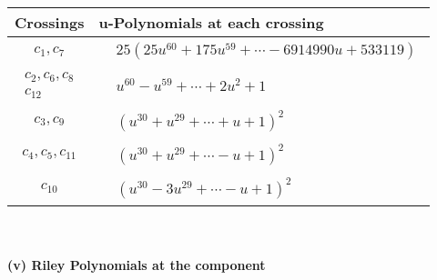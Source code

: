 \documentclass[1p]{elsarticle_modified}
\theoremstyle{definition}
\begin{document}
\begin{tabular}{m{50pt}|m{274pt}}
Crossings & \hspace{64pt}u-Polynomials at each crossing \\
\hline $$\begin{aligned}c_{1},c_{7}\end{aligned}$$&$\begin{aligned}
&25(25 u^{60}+175 u^{59}+\cdots-6914990 u+533119)
\end{aligned}$\\
\hline $$\begin{aligned}c_{2},c_{6},c_{8}\\c_{12}\end{aligned}$$&$\begin{aligned}
&u^{60}- u^{59}+\cdots+2 u^2+1
\end{aligned}$\\
\hline $$\begin{aligned}c_{3},c_{9}\end{aligned}$$&$\begin{aligned}
&(u^{30}+u^{29}+\cdots+u+1)^{2}
\end{aligned}$\\
\hline $$\begin{aligned}c_{4},c_{5},c_{11}\end{aligned}$$&$\begin{aligned}
&(u^{30}+u^{29}+\cdots- u+1)^{2}
\end{aligned}$\\
\hline $$\begin{aligned}c_{10}\end{aligned}$$&$\begin{aligned}
&(u^{30}-3 u^{29}+\cdots- u+1)^{2}
\end{aligned}$\\
\hline
\end{tabular}\\~\\
\newpage\renewcommand{\arraystretch}{1}
\flushleft \textbf{(v) Riley Polynomials at the component}\newline \\
\end{document}
